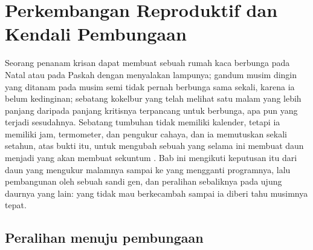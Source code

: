 \chapter{Perkembangan Reproduktif dan Kendali Pembungaan}\label{ch:b2:plant-flowering}

Seorang penanam krisan dapat membuat sebuah rumah kaca berbunga pada
Natal atau pada Paskah dengan menyalakan lampunya; gandum musim dingin
yang ditanam pada musim semi tidak pernah berbunga sama sekali, karena
ia belum kedinginan; sebatang kokelbur yang telah melihat satu malam
yang lebih panjang daripada panjang kritisnya terpancang untuk berbunga,
apa pun yang terjadi sesudahnya. Sebatang tumbuhan tidak memiliki
kalender, tetapi ia memiliki jam, termometer, dan pengukur cahaya, dan
ia memutuskan sekali setahun, atas bukti itu, untuk mengubah sebuah
 yang selama ini membuat daun menjadi  yang akan membuat
sekuntum . Bab ini mengikuti keputusan itu dari daun yang mengukur
malamnya sampai ke  yang mengganti programnya, lalu pembangunan
 oleh sebuah sandi gen, dan peralihan sebaliknya pada ujung
daurnya yang lain:  yang tidak mau berkecambah sampai ia diberi tahu
musimnya tepat.

\section{Peralihan menuju pembungaan}


